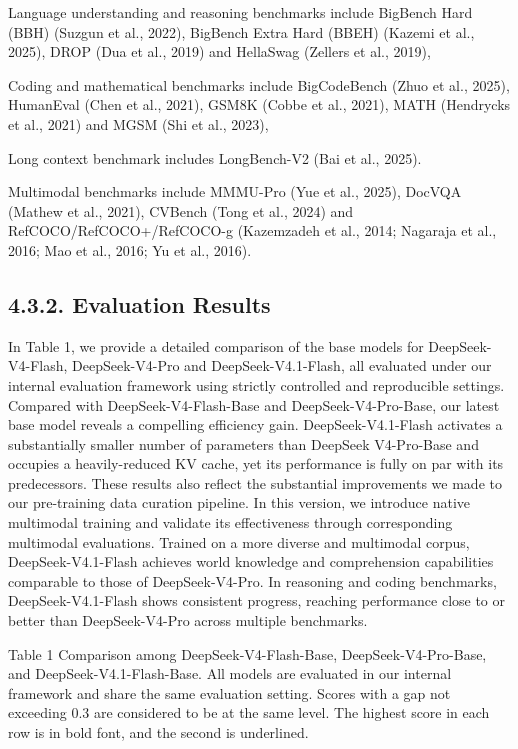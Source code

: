 \documentclass[
  10
]{article}
\begin{document}
Language understanding and reasoning benchmarks include BigBench Hard
(BBH) (Suzgun et al., 2022), BigBench Extra Hard (BBEH) (Kazemi et al.,
2025), DROP (Dua et al., 2019) and HellaSwag (Zellers et al., 2019),

Coding and mathematical benchmarks include BigCodeBench (Zhuo et al.,
2025), HumanEval (Chen et al., 2021), GSM8K (Cobbe et al., 2021), MATH
(Hendrycks et al., 2021) and MGSM (Shi et al., 2023),

Long context benchmark includes LongBench-V2 (Bai et al., 2025).

Multimodal benchmarks include MMMU-Pro (Yue et al., 2025), DocVQA
(Mathew et al., 2021), CVBench (Tong et al., 2024) and
RefCOCO/RefCOCO+/RefCOCO-g (Kazemzadeh et al., 2014; Nagaraja et al.,
2016; Mao et al., 2016; Yu et al., 2016).

\subsection{4.3.2. Evaluation Results}\label{evaluation-results}

In Table 1, we provide a detailed comparison of the base models for
DeepSeek-V4-Flash, DeepSeek-V4-Pro and DeepSeek-V4.1-Flash, all
evaluated under our internal evaluation framework using strictly
controlled and reproducible settings. Compared with
DeepSeek-V4-Flash-Base and DeepSeek-V4-Pro-Base, our latest base model
reveals a compelling efficiency gain. DeepSeek-V4.1-Flash activates a
substantially smaller number of parameters than DeepSeek V4-Pro-Base and
occupies a heavily-reduced KV cache, yet its performance is fully on par
with its predecessors. These results also reflect the substantial
improvements we made to our pre-training data curation pipeline. In this
version, we introduce native multimodal training and validate its
effectiveness through corresponding multimodal evaluations. Trained on a
more diverse and multimodal corpus, DeepSeek-V4.1-Flash achieves world
knowledge and comprehension capabilities comparable to those of
DeepSeek-V4-Pro. In reasoning and coding benchmarks, DeepSeek-V4.1-Flash
shows consistent progress, reaching performance close to or better than
DeepSeek-V4-Pro across multiple benchmarks.

Table 1 \textbar{} Comparison among DeepSeek-V4-Flash-Base,
DeepSeek-V4-Pro-Base, and DeepSeek-V4.1-Flash-Base. All models are
evaluated in our internal framework and share the same evaluation
setting. Scores with a gap not exceeding 0.3 are considered to be at the
same level. The highest score in each row is in bold font, and the
second is underlined.
\end{document}
